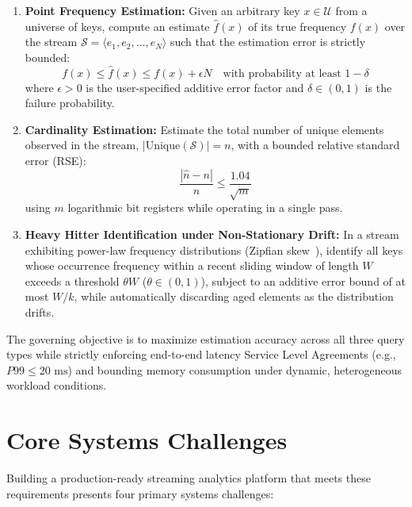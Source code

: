 \begin{enumerate}
 \item \textbf{Point Frequency Estimation:} Given an arbitrary key $x \in \mathcal{U}$ from a universe of keys, compute an estimate $\hat{f}(x)$ of its true frequency $f(x)$ over the stream $\mathcal{S} = \langle e_1, e_2, \dots, e_N \rangle$ such that the estimation error is strictly bounded:
 \begin{equation}
        f(x) \le \hat{f}(x) \le f(x) + \epsilon N \quad \text{with probability at least } 1 - \delta
    \end{equation}
 where $\epsilon > 0$ is the user-specified additive error factor and $\delta \in (0, 1)$ is the failure probability.

 \item \textbf{Cardinality Estimation:} Estimate the total number of unique elements observed in the stream, $| \text{Unique}(\mathcal{S}) | = n$, with a bounded relative standard error (RSE):
 \begin{equation}
        \frac{|\hat{n} - n|}{n} \le \frac{1.04}{\sqrt{m}}
    \end{equation}
 using $m$ logarithmic bit registers while operating in a single pass.

 \item \textbf{Heavy Hitter Identification under Non-Stationary Drift:} In a stream exhibiting power-law frequency distributions (Zipfian skew~\cite{zipf}), identify all keys whose occurrence frequency within a recent sliding window of length $W$ exceeds a threshold $\theta W$ ($\theta \in (0, 1)$), subject to an additive error bound of at most $W / k$, while automatically discarding aged elements as the distribution drifts.
\end{enumerate}

The governing objective is to maximize estimation accuracy across all three query types while strictly enforcing end-to-end latency Service Level Agreements (e.g., $P99 \le 20\text{ ms}$) and bounding memory consumption under dynamic, heterogeneous workload conditions.

\section{Core Systems Challenges}

Building a production-ready streaming analytics platform that meets these requirements presents four primary systems challenges:

